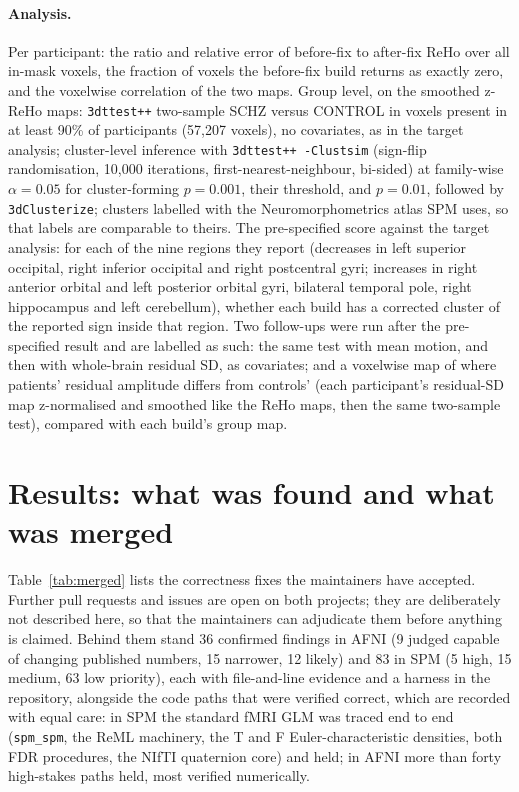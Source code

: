 \documentclass[11pt]{article}
\newcommand{\code}[1]{\texttt{#1}}
\begin{document}
\paragraph{Analysis.} Per participant: the ratio and relative error of before-fix to after-fix ReHo over all in-mask voxels, the fraction of voxels the before-fix build returns as exactly zero, and the voxelwise correlation of the two maps. Group level, on the smoothed z-ReHo maps: \code{3dttest++} two-sample SCHZ versus CONTROL in voxels present in at least 90\% of participants (57{,}207 voxels), no covariates, as in the target analysis; cluster-level inference with \code{3dttest++ -Clustsim} (sign-flip randomisation, 10{,}000 iterations, first-nearest-neighbour, bi-sided) at family-wise $\alpha = 0.05$ for cluster-forming $p = 0.001$, their threshold, and $p = 0.01$, followed by \code{3dClusterize}; clusters labelled with the Neuromorphometrics atlas SPM uses, so that labels are comparable to theirs. The pre-specified score against the target analysis: for each of the nine regions they report (decreases in left superior occipital, right inferior occipital and right postcentral gyri; increases in right anterior orbital and left posterior orbital gyri, bilateral temporal pole, right hippocampus and left cerebellum), whether each build has a corrected cluster of the reported sign inside that region. Two follow-ups were run after the pre-specified result and are labelled as such: the same test with mean motion, and then with whole-brain residual SD, as covariates; and a voxelwise map of where patients' residual amplitude differs from controls' (each participant's residual-SD map z-normalised and smoothed like the ReHo maps, then the same two-sample test), compared with each build's group map.

\section{Results: what was found and what was merged}
\label{sec:results}
Table~\ref{tab:merged} lists the correctness fixes the maintainers have accepted. Further pull requests and issues are open on both projects; they are deliberately not described here, so that the maintainers can adjudicate them before anything is claimed. Behind them stand 36 confirmed findings in AFNI (9 judged capable of changing published numbers, 15 narrower, 12 likely) and 83 in SPM (5 high, 15 medium, 63 low priority), each with file-and-line evidence and a harness in the repository, alongside the code paths that were verified correct, which are recorded with equal care: in SPM the standard fMRI GLM was traced end to end (\code{spm\_spm}, the ReML machinery, the T and F Euler-characteristic densities, both FDR procedures, the NIfTI quaternion core) and held; in AFNI more than forty high-stakes paths held, most verified numerically.
\end{document}
